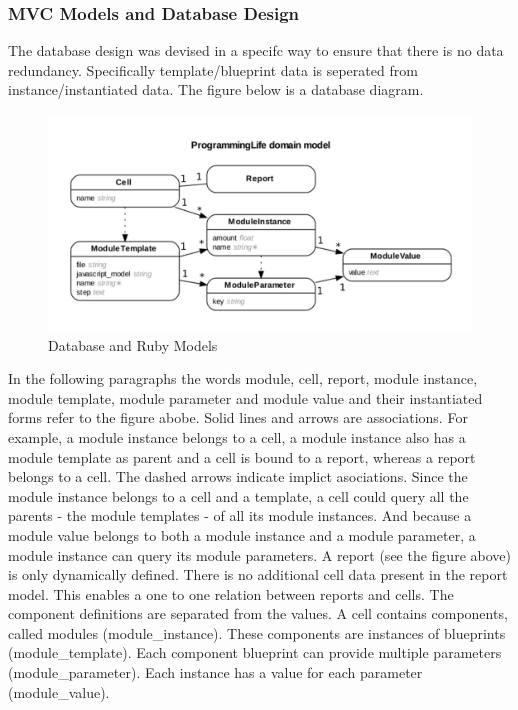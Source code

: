 \documentclass{report}
\begin{document}
				\subsubsection{MVC Models and Database Design}
					The database design was devised in a specifc way to ensure that there is no data redundancy. Specifically template/blueprint data is seperated from instance/instantiated data. The figure below is a database diagram.
					\begin{figure}[htb]
						\begin{center}
							\includegraphics[width=\linewidth]{erd.pdf}
							\caption{Database and Ruby Models}
							\label{fig: erd}
						\end{center}
					\end{figure}
					In the following paragraphs the words module, cell, report, module instance, module template, module parameter and module value and their instantiated forms refer to the figure abobe.
					Solid lines and arrows are associations.  For example, a module instance belongs to a cell, a module instance also has a module template as parent and a cell is bound to a report, whereas a report belongs to a cell.
					The dashed arrows indicate implict asociations. Since the module instance belongs to a cell and a template, a cell could query all the parents - the module templates - of all its module instances. And because a module value belongs to both a module instance and a module parameter, a module instance can query its module parameters.
					A report (see the figure above) is only dynamically defined. There is no additional cell data present in the report model. This enables a one to one relation between reports and cells. The component definitions are separated from the values. A cell contains components, called modules (module\_instance). These components are instances of blueprints (module\_template). Each component blueprint can provide multiple parameters (module\_parameter). Each instance has a value for each parameter (module\_value).\\
					
\end{document}
